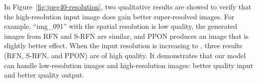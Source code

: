 \documentclass[preprint]{elsarticle}
\begin{document}
In Figure~\ref{fig:jpeg40-resolution}, two qualitative results are showed to verify that the high-resolution input image does gain better super-resolved images. For example, ``img\_091'' with the spatial resolution  is low quality, the generated images from RFN and S-RFN are similar, and PPON produces an image that is slightly better effect. When the input resolution is increasing to , three results (RFN, S-RFN, and PPON) are of high quality. It demonstrates that our model can handle low-resolution images and high-resolution images: better quality input and better quality output.
\end{document}
